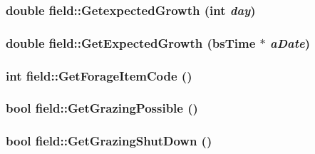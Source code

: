\label{classfield_a2bb1e4784fca6aed504a2ab7d4f200a0}
\hypertarget{classfield_a090eef7a1e95aaa0d997f14952d7068e}{
\subsubsection[{GetexpectedGrowth}]{\setlength{\rightskip}{0pt plus 5cm}double field::GetexpectedGrowth (int {\em day})}}
\label{classfield_a090eef7a1e95aaa0d997f14952d7068e}
\hypertarget{classfield_aaa9134b4cb75d4cbed4c90015f20b48f}{
\subsubsection[{GetExpectedGrowth}]{\setlength{\rightskip}{0pt plus 5cm}double field::GetExpectedGrowth ({\bf bsTime} $\ast$ {\em aDate})}}
\label{classfield_aaa9134b4cb75d4cbed4c90015f20b48f}
\hypertarget{classfield_a0354c55d8c1fff919fd9f54ede284d64}{
\subsubsection[{GetForageItemCode}]{\setlength{\rightskip}{0pt plus 5cm}int field::GetForageItemCode ()}}
\label{classfield_a0354c55d8c1fff919fd9f54ede284d64}
\hypertarget{classfield_aadde0ba8d453394c5e790f7e92c0cb35}{
\subsubsection[{GetGrazingPossible}]{\setlength{\rightskip}{0pt plus 5cm}bool field::GetGrazingPossible ()}}
\label{classfield_aadde0ba8d453394c5e790f7e92c0cb35}
\hypertarget{classfield_aaa75ae81d0511e47197059ee64b38dc5}{
\subsubsection[{GetGrazingShutDown}]{\setlength{\rightskip}{0pt plus 5cm}bool field::GetGrazingShutDown ()}}
